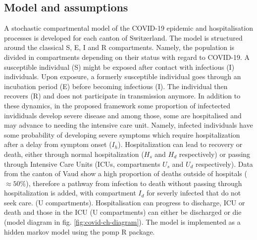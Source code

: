 \subsection{Model and assumptions}
A stochastic compartmental model of the COVID-19 epidemic and hospitalisation processes is developed for each canton of Switzerland. The model is structured around the classical S, E, I and R compartments\cite{Kermack:ContributionMathematicalTheory:1927}. Namely, the population is divided in compartments depending on their status with regard to COVID-19. A susceptible individual (S) might be exposed after contact with infectious (I) individuals. Upon exposure, a formerly susceptible individual goes through an incubation period (E) before becoming infectious (I). The individual then recovers (R) and does not participate in transmission anymore. In addition to these dynamics, in the proposed framework some proportion of infectected invididuals develop severe disease and among those, some are hospitalised and may advance to needing the intensive care unit. Namely, infected individuals have some probability of developing severe symptoms which require hospitalization after a delay from symptom onset ($I_h$). Hospitalization can lead to recovery or death, either through normal hospitalization ($H_{s}$ and $H_d$ respectively) or passing through Intensive Care Units (ICUs, compartments $U_{s}$ and $U_d$ respectively). Data from the canton of Vaud show a high proportion of deaths outside of hospitals ($\approx 50\%$), therefore a pathway from infection to death without passing through hospitalization is added, with compartment $I_d$ for severly infected that do not seek care. 
 (U compartments). Hospitalisation can progress to discharge, ICU or death and those in the ICU (U compartments) can either be discharged or die (model diagram in fig. \ref{fig:covid-ch-diagram}).  The model is implemented as a hidden markov model using the pomp R package\cite[-8\baselineskip]{King:StatisticalInferencePartially:2015}. 
